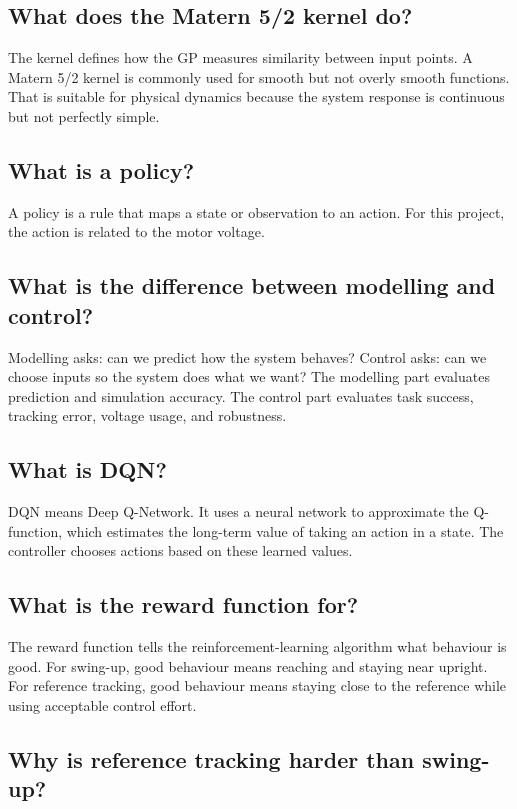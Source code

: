\documentclass[11pt,a4paper]{article}
\begin{document}
\subsection*{What does the Matern 5/2 kernel do?}

The kernel defines how the GP measures similarity between input points.
A Matern 5/2 kernel is commonly used for smooth but not overly smooth functions.
That is suitable for physical dynamics because the system response is continuous but not perfectly simple.

\subsection*{What is a policy?}

A policy is a rule that maps a state or observation to an action.
For this project, the action is related to the motor voltage.

\subsection*{What is the difference between modelling and control?}

Modelling asks: can we predict how the system behaves?
Control asks: can we choose inputs so the system does what we want?
The modelling part evaluates prediction and simulation accuracy.
The control part evaluates task success, tracking error, voltage usage, and robustness.

\subsection*{What is DQN?}

DQN means Deep Q-Network.
It uses a neural network to approximate the Q-function, which estimates the long-term value of taking an action in a state.
The controller chooses actions based on these learned values.

\subsection*{What is the reward function for?}

The reward function tells the reinforcement-learning algorithm what behaviour is good.
For swing-up, good behaviour means reaching and staying near upright.
For reference tracking, good behaviour means staying close to the reference while using acceptable control effort.

\subsection*{Why is reference tracking harder than swing-up?}
\end{document}
